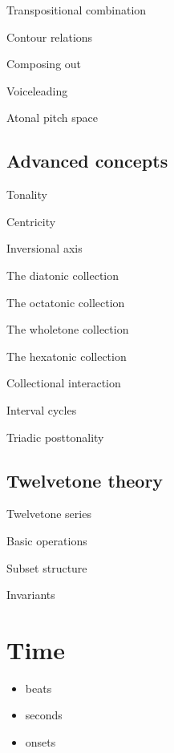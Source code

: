 \documentclass[letterpaper,10pt,english]{sphinxmanual}
\begin{document}
\sphinxAtStartPar
Transpositional combination

\sphinxAtStartPar
Contour relations

\sphinxAtStartPar
Composing out

\sphinxAtStartPar
Voice\sphinxhyphen{}leading

\sphinxAtStartPar
Atonal pitch space


\section{Advanced concepts}
\label{\detokenize{3_set_theory:advanced-concepts}}
\sphinxAtStartPar
Tonality

\sphinxAtStartPar
Centricity

\sphinxAtStartPar
Inversional axis

\sphinxAtStartPar
The diatonic collection

\sphinxAtStartPar
The octatonic collection

\sphinxAtStartPar
The whole\sphinxhyphen{}tone collection

\sphinxAtStartPar
The hexatonic collection

\sphinxAtStartPar
Collectional interaction

\sphinxAtStartPar
Interval cycles

\sphinxAtStartPar
Triadic post\sphinxhyphen{}tonality


\section{Twelve\sphinxhyphen{}tone theory}
\label{\detokenize{3_set_theory:twelve-tone-theory}}
\sphinxAtStartPar
Twelve\sphinxhyphen{}tone series

\sphinxAtStartPar
Basic operations

\sphinxAtStartPar
Subset structure

\sphinxAtStartPar
Invariants


\chapter{Time}
\label{\detokenize{4_time:time}}\label{\detokenize{4_time:id1}}\label{\detokenize{4_time::doc}}\begin{itemize}
\item {} 
\sphinxAtStartPar
beats

\item {} 
\sphinxAtStartPar
seconds

\item {} 
\sphinxAtStartPar
onsets

\end{itemize}
\end{document}
